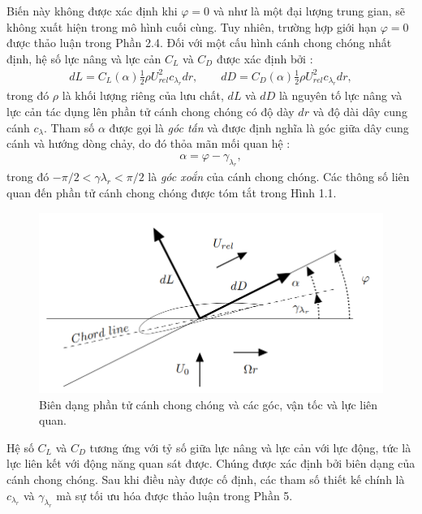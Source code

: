 \documentclass[a4paper,twoside,13pt]{extbook}
\begin{document}
Biến này không được xác định khi $\varphi=0$ và như là một đại lượng trung gian, sẽ không xuất hiện trong mô hình cuối cùng. Tuy nhiên, trường hợp giới hạn $\varphi=0$ được thảo luận trong Phần 2.4. Đối với một cấu hình cánh chong chóng nhất định, hệ số lực nâng và lực cản $C_L$ và $C_D$ được xác định bởi :
\begin{equation}\label{eq:1_5}
    \begin{aligned}
        dL = {C_L}\left( \alpha  \right)\frac{1}{2}\rho U_{rel}^2{c_{{\lambda _r}}}dr,\qquad dD = {C_D}\left( \alpha  \right)\frac{1}{2}\rho U_{rel}^2{c_{{\lambda _r}}}dr,
    \end{aligned}
\end{equation}
trong đó $\rho$ là khối lượng riêng của lưu chất, $dL$ và $dD$ là nguyên tố lực nâng và lực cản tác dụng lên phần tử cánh chong chóng có độ dày $dr$ và độ dài dây cung cánh $c_{\lambda}$. Tham số $\alpha$ được gọi là \emph{góc tấn} và được định nghĩa là góc giữa dây cung cánh và hướng dòng chảy, 
do đó thỏa mãn mối quan hệ :
\begin{equation}\label{eq:1_6}
    \begin{aligned}
        \alpha  = \varphi  - \gamma_{\lambda _r},
    \end{aligned}
\end{equation}
trong đó $- \pi /2 < \gamma {\lambda _r} < \pi /2$ là \emph{góc xoắn} của cánh chong chóng. Các thông số liên quan đến phần tử cánh chong chóng được tóm tắt trong Hình 1.1.
\begin{figure}[h!]
	\centering
	\includegraphics[scale=0.75]{BLADE_PROFILE.png}
	\caption{Biên dạng phần tử cánh chong chóng và các góc, vận tốc và lực liên quan.}
\end{figure}

Hệ số $C_L$ và $C_D$ tương ứng với tỷ số giữa lực nâng và lực cản với lực động, tức là lực liên kết với động năng quan sát được. Chúng được xác định bởi biên dạng của cánh chong chóng. Sau khi điều này được cố định, các tham số thiết kế chính là $c_{\lambda_r}$ và $\gamma_{\lambda_r}$ mà sự tối ưu hóa được thảo luận trong Phần 5.
\end{document}
